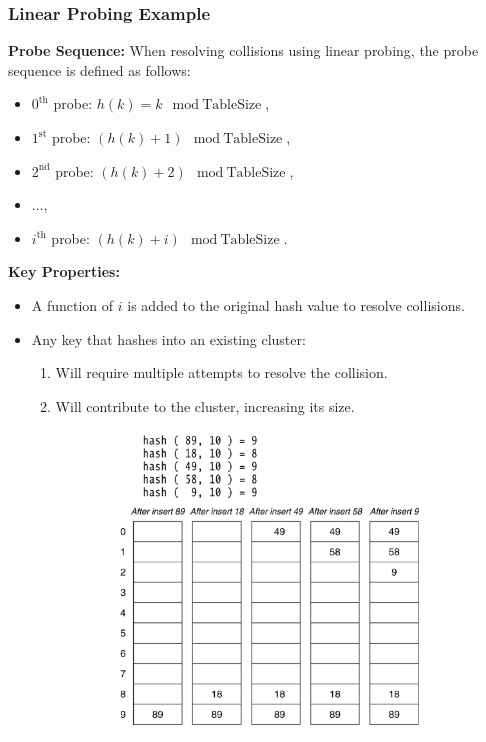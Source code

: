 \subsubsection{Linear Probing Example}

\textbf{Probe Sequence:}  
When resolving collisions using linear probing, the probe sequence is defined as follows:

\begin{itemize}
    \item \( 0^\text{th} \) probe: \( h(k) = k \mod \text{TableSize} \),
    \item \( 1^\text{st} \) probe: \( (h(k) + 1) \mod \text{TableSize} \),
    \item \( 2^\text{nd} \) probe: \( (h(k) + 2) \mod \text{TableSize} \),
    \item \(\dots\),
    \item \( i^\text{th} \) probe: \( (h(k) + i) \mod \text{TableSize} \).
\end{itemize}
\textbf{Key Properties:}
\begin{itemize}
    \item A function of \( i \) is added to the original hash value to resolve collisions.
    \item Any key that hashes into an existing cluster:
    \begin{enumerate}
        \item Will require multiple attempts to resolve the collision.
        \item Will contribute to the cluster, increasing its size.
    \end{enumerate}
\end{itemize}


\begin{figure}[H]
    \centering
    \includegraphics[width=0.75\linewidth]{linear probing.png}
\end{figure}




